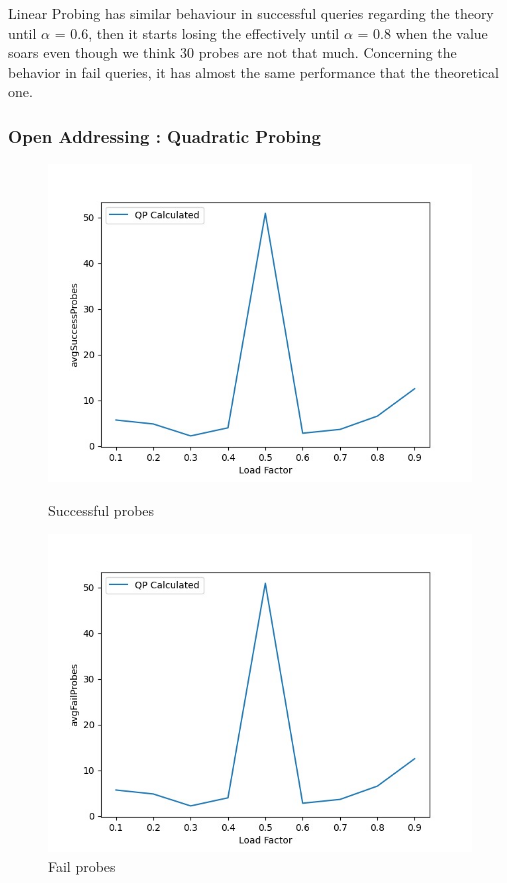 \documentclass{article}
\begin{document}
     Linear Probing has similar behaviour in successful queries regarding the theory until $\alpha$ = 0.6, then it starts losing the effectively until $\alpha$ = 0.8 when the value soars even though we think 30 probes are not that much.
    Concerning the behavior in fail queries, it has almost the same performance that the theoretical one.
    
\subsubsection*{Open Addressing : Quadratic Probing}

        \begin{figure}[!h]
          \includegraphics[width=\linewidth]{images/loadFactor_vs_avgSuccessProbes_QP.jpeg}
          \caption{Successful probes}\label{fig:plot6}
        \endminipage\hfill
          \includegraphics[width=\linewidth]{images/loadFactor_vs_avgFailProbes_QP.jpeg}
          \caption{Fail probes}\label{fig:plot7}
        \endminipage
    \end{figure}
    
\end{document}
